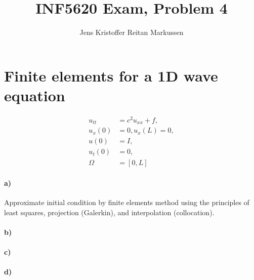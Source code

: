 \documentclass[11pt,a4paper]{article}
\author{Jens Kristoffer Reitan Markussen}
\title{INF5620 Exam, Problem 4}
\begin{document}
\maketitle
\section*{Finite elements for a 1D wave equation}
\begin{align}
u_{tt} &= c^2u_{xx} + f,\\
u_{x}(0) &= 0, u_{x}(L) = 0,\\
u(0) &= I,\\
u_{t}(0) &= 0, \\ 
\Omega &= [0,L]
\end{align}
\paragraph*{a)}
Approximate initial condition by finite elements method using the principles of least squares, projection (Galerkin), and interpolation (collocation).

\paragraph*{b)}
\paragraph*{c)}
\paragraph*{d)}
\end{document}
